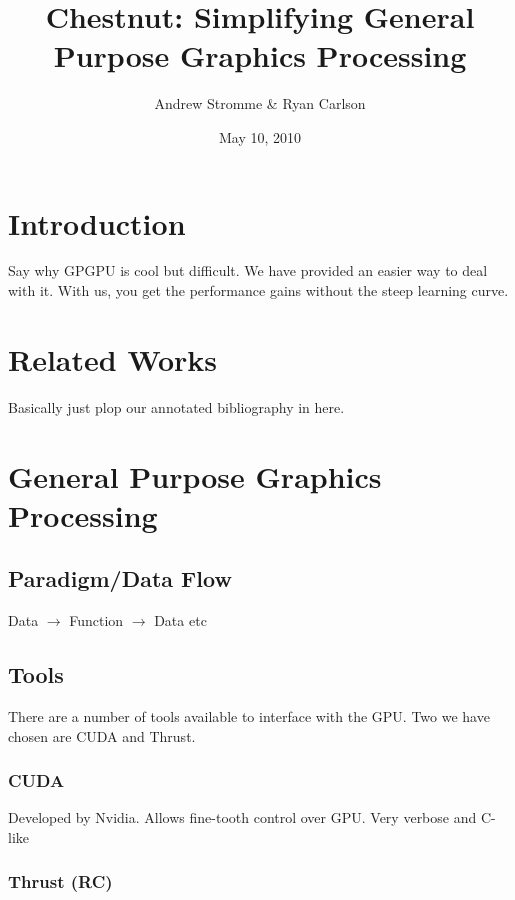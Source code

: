 \documentclass{article}
\renewcommand{\|}{\origbar} %
\begin{document}
\title{Chestnut: Simplifying General Purpose Graphics Processing}
\author{Andrew Stromme \& Ryan Carlson}
\date{May 10, 2010}
\maketitle

\begin{abstract}
\end{abstract}

\section{Introduction}

Say why GPGPU is cool but difficult. We have provided an easier way to deal with it. With us, you get the performance gains without the steep learning curve.

\section{Related Works}

Basically just plop our annotated bibliography in here.

\section{General Purpose Graphics Processing}

\subsection{Paradigm/Data Flow}

Data $\rightarrow$ Function $\rightarrow$ Data etc

\subsection{Tools}

There are a number of tools available to interface with the GPU. Two we have chosen are CUDA and Thrust.

\subsubsection{CUDA}

Developed by Nvidia. Allows fine-tooth control over GPU. Very verbose and C-like

\subsubsection{Thrust (RC)}
\end{document}
